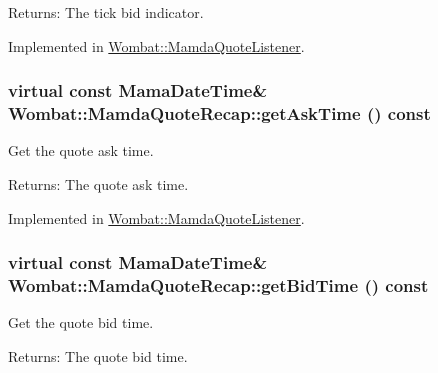 \begin{Desc}
\item[Returns:]The tick bid indicator. \end{Desc}


Implemented in \hyperlink{classWombat_1_1MamdaQuoteListener_3f4102824e3e3d8a0032c0978067387f}{Wombat::Mamda\-Quote\-Listener}.\hypertarget{classWombat_1_1MamdaQuoteRecap_4d1e7288ed0a726a23f66aa9ed212afa}{
\subsubsection[getAskTime]{\setlength{\rightskip}{0pt plus 5cm}virtual const Mama\-Date\-Time\& Wombat::Mamda\-Quote\-Recap::get\-Ask\-Time () const}}
\label{classWombat_1_1MamdaQuoteRecap_4d1e7288ed0a726a23f66aa9ed212afa}


Get the quote ask time. 

\begin{Desc}
\item[Returns:]The quote ask time. \end{Desc}


Implemented in \hyperlink{classWombat_1_1MamdaQuoteListener_2b0b0dd373fe54f67149a708ee147e79}{Wombat::Mamda\-Quote\-Listener}.\hypertarget{classWombat_1_1MamdaQuoteRecap_42016fe76b884a22fb769c3eceac39ad}{
\subsubsection[getBidTime]{\setlength{\rightskip}{0pt plus 5cm}virtual const Mama\-Date\-Time\& Wombat::Mamda\-Quote\-Recap::get\-Bid\-Time () const}}
\label{classWombat_1_1MamdaQuoteRecap_42016fe76b884a22fb769c3eceac39ad}


Get the quote bid time. 

\begin{Desc}
\item[Returns:]The quote bid time. \end{Desc}


